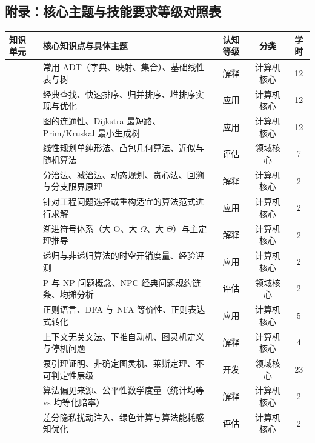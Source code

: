\begin{strip}
\section{附录：核心主题与技能要求等级对照表}
\noindent\begin{tabularx}{\textwidth}{p{} Y c c c}
\toprule
\textbf{知识单元} & \textbf{核心知识点与具体主题} & \textbf{认知等级} & \textbf{分类} & \textbf{学时} \\
\midrule
{} 
& 常用 ADT（字典、映射、集合）、基础线性表与树 & 解释 & 计算机核心 & 12 \\
& 经典查找、快速排序、归并排序、堆排序实现与优化 & 应用 & 计算机核心 & 12 \\
& 图的连通性、Dijkstra 最短路、Prim/Kruskal 最小生成树 & 应用 & 计算机核心 & 12 \\
& 线性规划单纯形法、凸包几何算法、近似与随机算法 & 评估 & 领域核心 & 7 \\
\midrule
{} 
& 分治法、减治法、动态规划、贪心法、回溯与分支限界原理 & 解释 & 计算机核心 & 2 \\
& 针对工程问题选择或重构适宜的算法范式进行求解 & 应用 & 计算机核心 & 2 \\
\midrule
{} 
& 渐进符号体系（大 O、大 $\Omega$、大 $\Theta$）与主定理推导 & 解释 & 计算机核心 & 2 \\
& 递归与非递归算法的时空开销度量、经验评测 & 应用 & 计算机核心 & 2 \\
& P 与 NP 问题概念、NPC 经典问题规约链条、均摊分析 & 评估 & 领域核心 & 2 \\
\midrule
{} 
& 正则语言、DFA 与 NFA 等价性、正则表达式转化 & 应用 & 计算机核心 & 5 \\
& 上下文无关文法、下推自动机、图灵机定义与停机问题 & 解释 & 计算机核心 & 4 \\
& 泵引理证明、非确定图灵机、莱斯定理、不可判定性层级 & 开发 & 领域核心 & 23 \\
\midrule
{} 
& 算法偏见来源、公平性数学度量（统计均等 vs 均等化赔率） & 解释 & 计算机核心 & 2 \\
& 差分隐私扰动注入、绿色计算与算法能耗感知优化 & 评估 & 计算机核心 & 2 \\
\bottomrule
\end{tabularx}
\end{strip}
